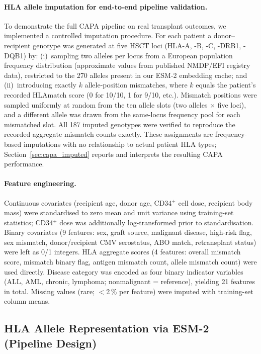 \documentclass[11pt,a4paper]{article}
\begin{document}
\paragraph{HLA allele imputation for end-to-end pipeline validation.}
To demonstrate the full CAPA pipeline on real transplant outcomes, we
implemented a controlled imputation procedure.  For each patient a
donor--recipient genotype was generated at five HSCT loci (HLA-A, -B, -C,
-DRB1, -DQB1) by: (i)~sampling two alleles per locus from a European
population frequency distribution (approximate values from published NMDP/EFI
registry data), restricted to the 270 alleles present in our ESM-2 embedding
cache; and (ii)~introducing exactly $k$ allele-position mismatches, where $k$
equals the patient's recorded HLAmatch score (0 for 10/10, 1 for 9/10, etc.).
Mismatch positions were sampled uniformly at random from the ten allele slots
(two alleles $\times$ five loci), and a different allele was drawn from the
same-locus frequency pool for each mismatched slot.  All 187 imputed genotypes
were verified to reproduce the recorded aggregate mismatch counts exactly.
These assignments are frequency-based imputations with no relationship to
actual patient HLA types; Section~\ref{sec:capa_imputed} reports and
interprets the resulting CAPA performance.

\paragraph{Feature engineering.}
Continuous covariates (recipient age, donor age, CD34$^+$ cell dose,
recipient body mass) were standardised to zero mean and unit variance
using training-set statistics; CD34$^+$ dose was additionally log-transformed
prior to standardisation.  Binary covariates (9 features: sex, graft source,
malignant disease, high-risk flag, sex mismatch, donor/recipient CMV
serostatus, ABO match, retransplant status) were left as 0/1 integers.  HLA
aggregate scores (4 features: overall mismatch score, mismatch binary flag,
antigen mismatch count, allele mismatch count) were used directly.  Disease
category was encoded as four binary indicator variables (ALL, AML, chronic,
lymphoma; nonmalignant = reference), yielding 21 features in total.
Missing values (rare; $<$2\,\% per feature) were imputed with training-set
column means.

\subsection{HLA Allele Representation via ESM-2 (Pipeline Design)}
\label{sec:esm2}
\end{document}
